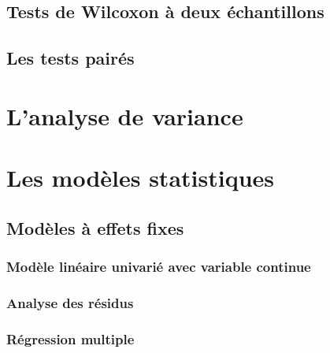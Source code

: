 \documentclass[]{book}
\begin{document}
\hypertarget{tests-de-wilcoxon-uxe0-deux-uxe9chantillons}{%
\subsection{Tests de Wilcoxon à deux
échantillons}\label{tests-de-wilcoxon-uxe0-deux-uxe9chantillons}}

\hypertarget{les-tests-pairuxe9s}{%
\subsection{Les tests pairés}\label{les-tests-pairuxe9s}}

\hypertarget{lanalyse-de-variance}{%
\section{L'analyse de variance}\label{lanalyse-de-variance}}

\hypertarget{les-moduxe8les-statistiques}{%
\section{Les modèles statistiques}\label{les-moduxe8les-statistiques}}

\hypertarget{moduxe8les-uxe0-effets-fixes}{%
\subsection{Modèles à effets fixes}\label{moduxe8les-uxe0-effets-fixes}}

\hypertarget{moduxe8le-linuxe9aire-univariuxe9-avec-variable-continue}{%
\subsubsection{Modèle linéaire univarié avec variable
continue}\label{moduxe8le-linuxe9aire-univariuxe9-avec-variable-continue}}

\hypertarget{analyse-des-ruxe9sidus}{%
\subsubsection{Analyse des résidus}\label{analyse-des-ruxe9sidus}}

\hypertarget{ruxe9gression-multiple}{%
\subsubsection{Régression multiple}\label{ruxe9gression-multiple}}
\end{document}
